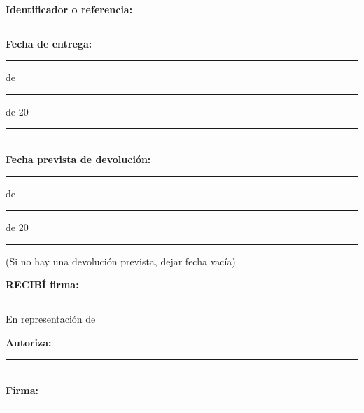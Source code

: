 {  \textbf{Identificador o referencia:} \rule{6.5cm}{0.4pt}

  \vspace{1em}

  \noindent \textbf{Fecha de entrega:} \rule{1cm}{0.4pt} de \rule{2cm}{0.4pt} de 20\rule{1cm}{0.4pt} \\

  \noindent \textbf{Fecha prevista de devolución:} \rule{1cm}{0.4pt} de \rule{2cm}{0.4pt} de 20\rule{1cm}{0.4pt}

  (Si no hay una devolución prevista, dejar fecha vacía)

  \vspace{3em}

  \noindent \textbf{RECIBÍ firma:} \rule{10cm}{0.4pt}

  \vspace{3em}

  En representación de \Beneficiario

  \noindent \textbf{Autoriza:} \rule{5cm}{0.4pt}  \\
  \textbf{Firma:} \rule{6cm}{0.4pt}

  \vfill
}